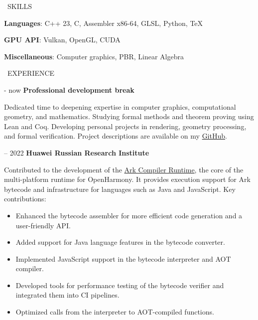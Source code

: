 \documentclass[11pt, a4paper]{cv_template}
\begin{document}
\vspace{10pt}

{\Large \faTools \ SKILLS}

\vspace{5pt}

{\hspace{1em} \large \textbf{Languages}: C++ 23, C, Assembler x86-64, GLSL, Python, TeX} \par
{\hspace{1em} \large \textbf{GPU API}: Vulkan, OpenGL, CUDA} \par
{\hspace{1em} \large \textbf{Miscellaneous}: Computer graphics, PBR, Linear Algebra}

\vspace{10pt}

{\Large \faBriefcase \ EXPERIENCE}

\vspace{5pt}

{\hspace{1em} \large \faBuilding {} - now \quad \textbf{Professional development break}} \par

\begin{addmargin}[3em]{0em}
Dedicated time to deepening expertise in computer graphics, computational geometry, and mathematics. Studying formal methods and theorem proving using Lean and Coq.  
Developing personal projects in rendering, geometry processing, and formal verification. Project descriptions are available on my \href{https://github.com/d-krylov/}{GitHub}.
\end{addmargin}

{\hspace{1em} \large \faBuilding {} -- 2022 \quad \textbf{Huawei Russian Research Institute}}

\begin{addmargin}[3em]{0em}
Contributed to the development of the \href{https://gitee.com/openharmony-sig/arkcompiler_runtime_core}{Ark Compiler Runtime}, the core of the multi-platform runtime for OpenHarmony. It provides execution support for Ark bytecode and infrastructure for languages such as Java and JavaScript. Key contributions:
\begin{itemize}[noitemsep, topsep=0pt]
\item Enhanced the bytecode assembler for more efficient code generation and a user-friendly API.
\item Added support for Java language features in the bytecode converter.
\item Implemented JavaScript support in the bytecode interpreter and AOT compiler.
\item Developed tools for performance testing of the bytecode verifier and integrated them into CI pipelines.
\item Optimized calls from the interpreter to AOT-compiled functions.
\end{itemize}
\end{addmargin}
\end{document}

